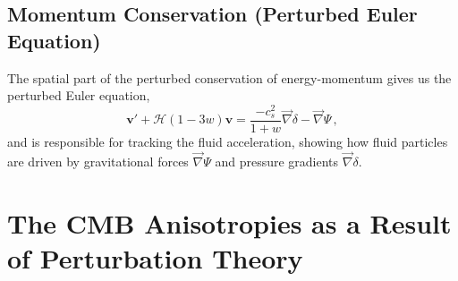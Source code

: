 \documentclass{book}
\begin{document}
	\subsection*{Momentum Conservation (Perturbed Euler Equation)}
	The spatial part of the perturbed conservation of energy-momentum gives us the perturbed Euler equation,
	\begin{equation}
		\mathbf{v}'+\mathcal{H}(1-3w)\mathbf{v}=\frac{-c^2_s}{1+w}\vec\nabla \delta - \vec \nabla \Psi \, ,
	\end{equation}
	and is responsible for tracking the fluid acceleration, showing how fluid particles are driven by gravitational forces $\vec\nabla\Psi$ and pressure gradients $\vec\nabla\delta$.
	
	
	\section{The CMB Anisotropies as a Result of Perturbation Theory}
\end{document}
